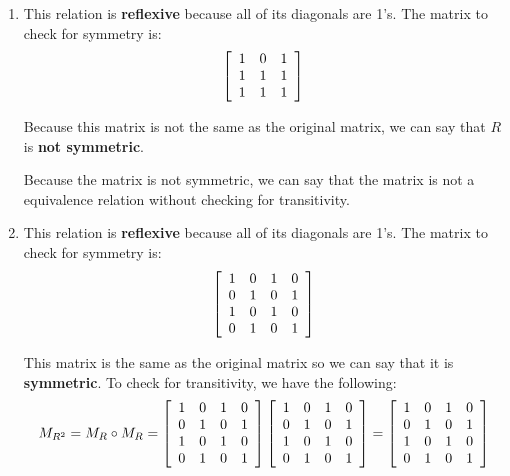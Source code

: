 \documentclass[letterpaper, 12pt]{article}
\begin{document}
\begin{enumerate}
    \item This relation is \textbf{reflexive} because all of its diagonals are 1's. The matrix to check for symmetry is:
    \[
    \left[
    \begin{array}{c c c}
         1 & 0 & 1 \\
         1 & 1 & 1 \\
         1 & 1 & 1
    \end{array}
    \right]
    \]
    
    Because this matrix is not the same as the original matrix, we can say that $R$ is \textbf{not symmetric}.
    
    Because the matrix is not symmetric, we can say that the matrix is not a equivalence relation without checking for transitivity.
    
    \item This relation is \textbf{reflexive} because all of its diagonals are 1's. The matrix to check for symmetry is:
    \[
    \left[
    \begin{array}{c c c c}
         1 & 0 & 1 & 0 \\
         0 & 1 & 0 & 1 \\
         1 & 0 & 1 & 0 \\
         0 & 1 & 0 & 1
    \end{array}
    \right]
    \]
    
    This matrix is the same as the original matrix so we can say that it is \textbf{symmetric}. To check for transitivity, we have the following:
    \[
    M_{R^2} = M_R \circ M_R =
    \left[
    \begin{array}{c c c c}
         1 & 0 & 1 & 0 \\
         0 & 1 & 0 & 1 \\
         1 & 0 & 1 & 0 \\
         0 & 1 & 0 & 1
    \end{array}
    \right]
    \left[
    \begin{array}{c c c c}
         1 & 0 & 1 & 0 \\
         0 & 1 & 0 & 1 \\
         1 & 0 & 1 & 0 \\
         0 & 1 & 0 & 1
    \end{array}
    \right]
    =
    \left[
    \begin{array}{c c c c}
         1 & 0 & 1 & 0 \\
         0 & 1 & 0 & 1 \\
         1 & 0 & 1 & 0 \\
         0 & 1 & 0 & 1
    \end{array}
    \right]
    \]
    

\end{enumerate}
\end{document}
